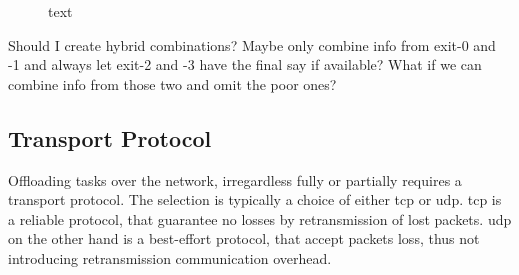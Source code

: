 \begin{figure}
	\centering
	\hfill
	\caption[short text]{text}
	\label{fig:info-combi}
\end{figure}

Should I create hybrid combinations? Maybe only combine info from exit-0 and -1 and always let exit-2 and -3 have the final say if available? What if we can combine info from those two and omit the poor ones? 

\subsection{Transport Protocol} 

Offloading tasks over the network, irregardless fully or partially requires a transport protocol. The selection is typically a choice of either \gls{tcp} or \gls{udp}. \gls{tcp} is a reliable protocol, that guarantee no losses by retransmission of lost packets. \gls{udp} on the other hand is a best-effort protocol, that accept packets loss, thus not introducing retransmission communication overhead. 


